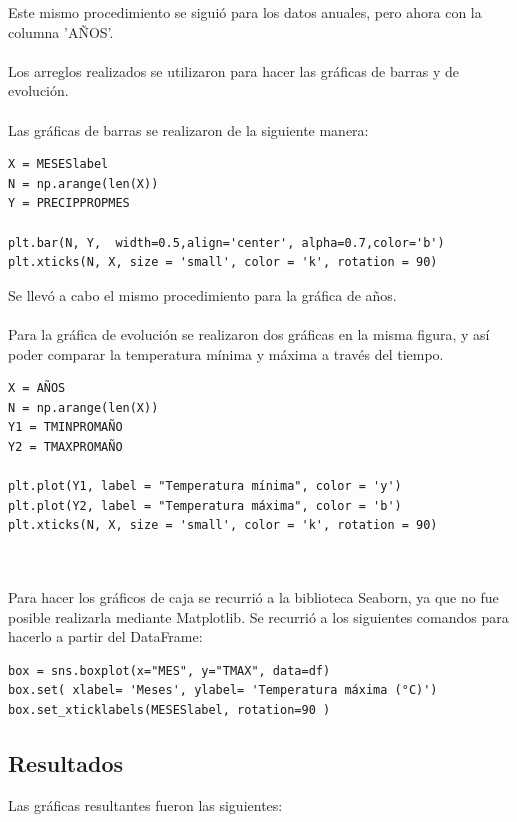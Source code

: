 \documentclass[letterpaper,12pt]{article}
\begin{document}
Este mismo procedimiento se siguió para los datos anuales, pero ahora con la columna 'AÑOS'.
\\
\\
Los arreglos realizados se utilizaron para hacer las gráficas de barras y de evolución.
\\
\\
Las gráficas de barras se realizaron de la siguiente manera:
\begin{verbatim}
X = MESESlabel
N = np.arange(len(X))
Y = PRECIPPROPMES 
 
plt.bar(N, Y,  width=0.5,align='center', alpha=0.7,color='b')
plt.xticks(N, X, size = 'small', color = 'k', rotation = 90)
\end{verbatim} 
Se llevó a cabo el mismo procedimiento para la gráfica de años.
\\
\\
Para la gráfica de evolución se realizaron dos gráficas en la misma figura, y así poder comparar la temperatura mínima y máxima a través del tiempo.
\begin{verbatim}
X = AÑOS
N = np.arange(len(X))
Y1 = TMINPROMAÑO
Y2 = TMAXPROMAÑO
 
plt.plot(Y1, label = "Temperatura mínima", color = 'y')   
plt.plot(Y2, label = "Temperatura máxima", color = 'b')
plt.xticks(N, X, size = 'small', color = 'k', rotation = 90)
\end{verbatim}
\\
\\
Para hacer los gráficos de caja se recurrió a la biblioteca Seaborn, ya que no fue posible realizarla mediante Matplotlib.
Se recurrió a los siguientes comandos para hacerlo a partir del DataFrame:

\begin{verbatim}
box = sns.boxplot(x="MES", y="TMAX", data=df)
box.set( xlabel= 'Meses', ylabel= 'Temperatura máxima (°C)')
box.set_xticklabels(MESESlabel, rotation=90 )
\end{verbatim}

\subsection{Resultados}
Las gráficas resultantes fueron las siguientes:
\end{document}
